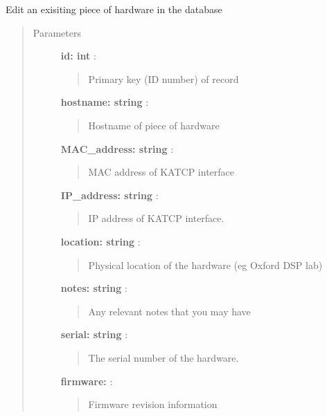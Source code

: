 \documentclass[letterpaper,10pt,english]{sphinxmanual}
\begin{document}
\begin{fulllineitems}
\label{index:roachnest_helpers.dbedit}
Edit an exisiting piece of hardware in the database
\begin{quote}\begin{description}
\item[{Parameters }] \leavevmode
\textbf{id: int} :
\begin{quote}

Primary key (ID number) of record
\end{quote}

\textbf{hostname: string} :
\begin{quote}

Hostname of piece of hardware
\end{quote}

\textbf{MAC\_address: string} :
\begin{quote}

MAC address of KATCP interface
\end{quote}

\textbf{IP\_address: string} :
\begin{quote}

IP address of KATCP interface.
\end{quote}

\textbf{location: string} :
\begin{quote}

Physical location of the hardware (eg Oxford DSP lab)
\end{quote}

\textbf{notes: string} :
\begin{quote}

Any relevant notes that you may have
\end{quote}

\textbf{serial: string} :
\begin{quote}

The serial number of the hardware.
\end{quote}

\textbf{firmware:} :
\begin{quote}

Firmware revision information
\end{quote}


\end{description}
\end{quote}
\end{fulllineitems}
\end{document}
